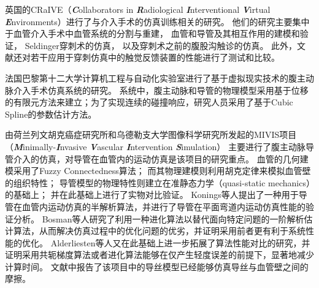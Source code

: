 英国的CRaIVE（\textbf{\textit{C}}ollaborators in \textbf{\textit{R}}adiological \textbf{\textit{I}}nterventional \textbf{\textit{V}}irtual \textbf{\textit{E}}nvironments）\cite{CRaIVEweb}进行了与介入手术的仿真训练相关的研究。
他们的研究主要集中于血管介入手术中血管系统的分割与重建\cite{Luboz2008aCRaIVE}，
血管和导管及其相互作用的建模和验证\cite{Luboz2010CRaIVE}\cite{Luboz2009aCRaIVE}\cite{Luboz2008CRaIVE}，
Seldinger穿刺术的仿真\cite{luboz2009CRaIVE}\cite{John2008CRaIVE}，
以及穿刺术之前的腹股沟触诊的仿真\cite{Coles2011CRaIVE}\cite{Coles2009CRaIVE}。
此外，文献\cite{Coles2010CRaIVE}还对若干应用于穿刺仿真中的触觉反馈装置的性能进行了测试和比较。

法国巴黎第十二大学计算机工程与自动化实验室进行了基于虚拟现实技术的腹主动脉介入手术仿真系统的研究\cite{Ghembaza2004Paris12U}。
系统中，腹主动脉和导管的物理模型采用基于位移的有限元方法来建立；为了实现连续的碰撞响应，研究人员采用了基于Cubic Spline的参数估计方法。

由荷兰列文胡克癌症研究所和乌德勒支大学图像科学研究所发起的MIVIS项目（\textbf{\textit{M}}inimally-\textbf{\textit{I}}nvasive \textbf{\textit{V}}ascular \textbf{\textit{I}}ntervention \textbf{\textit{S}}imulation）\cite{alderliesten2002NKI}\cite{Konings2003NKI}\cite{alderliesten2004NKI}\cite{Bosman2005NKI}\cite{alderliesten2007NKI}\cite{alderliesten2007aNKI}
主要进行了腹主动脉导管介入的仿真，对导管在血管内的运动仿真是该项目的研究重点。
血管的几何建模采用了Fuzzy Connectedness算法\cite{Udupa1996NKI}\cite{alderliesten2002NKI}\cite{alderliesten2004NKI}；
而其物理建模则利用胡克定律来模拟血管壁的组织特性\cite{alderliesten2002NKI}\cite{alderliesten2004NKI}；
导管模型的物理特性则建立在准静态力学（quasi-static mechanics）的基础上\cite{alderliesten2002NKI}\cite{alderliesten2004NKI}；
并在此基础上进行了实物对比验证\cite{alderliesten2002NKI}\cite{alderliesten2004NKI}。
Konings等人\cite{Konings2003NKI}提出了一种用于导管在血管内运动仿真的半解析算法，并进行了导管在平面弯道内运动仿真性能的验证分析。
Bosman等人\cite{Bosman2005NKI}研究了利用一种进化算法以替代面向特定问题的一阶解析估计算法，从而解决仿真过程中的优化问题的优劣，并证明采用前者更有利于系统性能的优化。
Alderliesten等人\cite{alderliesten2007NKI}又在此基础上进一步拓展了算法性能对比的研究，并证明采用共轭梯度算法或者进化算法能够在仅产生轻度误差的前提下，显著地减少计算时间。
文献\cite{alderliesten2007aNKI}中报告了该项目中的导丝模型已经能够仿真导丝与血管壁之间的摩擦。

